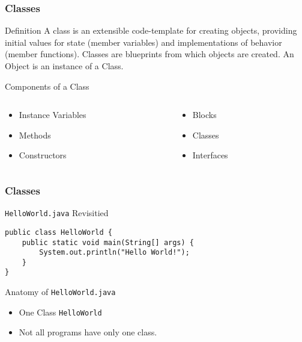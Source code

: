 \documentclass[10pt, compress]{beamer}
\begin{document}
\begin{frame}[fragile]
	\frametitle{Classes}
	\begin{block}{Definition}
	A class is an extensible code-template for creating objects, providing initial values for state (member variables) and implementations of behavior (member functions). Classes are blueprints from which objects are created. An Object is an instance of a Class.
	\end{block}
	\begin{block}{Components of a Class}
		\begin{columns}
			\begin{column}{0.5\textwidth}
				\begin{itemize}
					\item[] Instance Variables
					\item[] Methods
					\item[] Constructors
				\end{itemize}
			\end{column}
			\begin{column}{0.5\textwidth}
				\begin{itemize}
					\item[] Blocks
					\item[] Classes
					\item[] Interfaces
				\end{itemize}
			\end{column}
		\end{columns}
	\end{block}
\end{frame}

\begin{frame}[fragile]
	\frametitle{Classes}
	\begin{block}{\texttt{HelloWorld.java} Revisitied}
		\begin{verbatim}
public class HelloWorld {
	public static void main(String[] args) {
		System.out.println("Hello World!");
	}
}
		\end{verbatim}
	\end{block}
	\begin{block}{Anatomy of \texttt{HelloWorld.java}}
		\begin{itemize}
			\item[] One Class \texttt{HelloWorld}
			\item[] Not all programs have only one class.
		\end{itemize}
	\end{block}
\end{frame}
\end{document}
